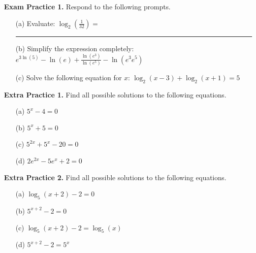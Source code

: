 \documentclass[10pt]{article}
\begin{document}
{\bf\color{blue}Exam Practice 1.} \reversemarginpar {}
%
Respond to the following prompts.
\begin{enumerate}
    
        \item[(a)] Evaluate: \quad $\displaystyle \log_{2} \left( \frac{1}{32} \right)=$\rule[-8pt]{1in}{0.4pt}
        
        
        \item[(b)] Simplify the expression completely: \quad $\displaystyle e^{3 \ln( 5)} - \ln( e ) + \frac{\ln( e^3)}{\ln( e^5)} - \ln( e^3 e^5) $
        
        
        \vfill
    
        \item[(c)] Solve the following equation for $x$: \quad $\displaystyle \log_2(x - 3) + \log_2(x + 1) = 5$
 
        \vfill
        \vfill
       
    \end{enumerate}


\newpage%

{\bf\color{blue}Extra Practice 1.} \reversemarginpar {}
%
Find all possible solutions to the following equations.
\begin{enumerate}
\item[(a)] $5^x-4=0$
    \vfill
\item[(b)] $5^x+5=0$
    \vfill
\item[(c)] $5^{2x}+5^x-20=0$
    \vfill
\item[(d)] $2e^{2x}-5e^x+2=0$
    \vfill
    \vfill
\end{enumerate}

\newpage
{\bf\color{blue}Extra Practice 2.} \reversemarginpar {} 
%
Find all possible solutions to the following equations.
\begin{enumerate}
\item[(a)] $\log_5(x+2)-2=0$
\vfill

\item[(b)] $5^{x+2}-2=0$
\vfill
\item[(c)] $\log_5(x+2)-2 = \log_5(x)$
\vfill
\item[(d)] $5^{x+2}-2=5^{x}$
\vfill
\end{enumerate}
\end{document}
